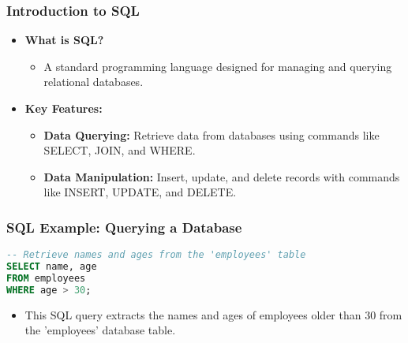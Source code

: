 \documentclass[aspectratio=169]{beamer}
\begin{document}
\begin{frame}[fragile]
    \frametitle{Introduction to SQL}
    \begin{itemize}
        \item \textbf{What is SQL?}
        \begin{itemize}
            \item A standard programming language designed for managing and querying relational databases.
        \end{itemize}
        \item \textbf{Key Features:}
        \begin{itemize}
            \item \textbf{Data Querying:} Retrieve data from databases using commands like SELECT, JOIN, and WHERE.
            \item \textbf{Data Manipulation:} Insert, update, and delete records with commands like INSERT, UPDATE, and DELETE.
        \end{itemize}
    \end{itemize}
\end{frame}

\begin{frame}[fragile]
    \frametitle{SQL Example: Querying a Database}
    \begin{lstlisting}[language=SQL]
-- Retrieve names and ages from the 'employees' table
SELECT name, age
FROM employees
WHERE age > 30;
    \end{lstlisting}
    \begin{itemize}
        \item This SQL query extracts the names and ages of employees older than 30 from the 'employees' database table.
    \end{itemize}
\end{frame}
\end{document}
